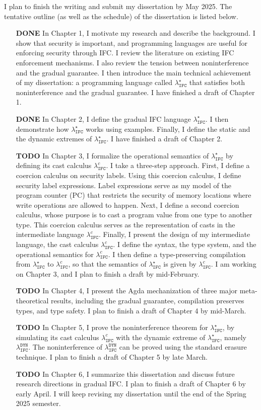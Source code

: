 \documentclass[10pt, letterpaper]{article}
\newcommand{\Surface}{\ensuremath{\lambda_{\mathtt{IFC}}^\star}\xspace}
\newcommand{\CC}{\ensuremath{\lambda_{\mathtt{IFC}}^{c}}\xspace}
\newcommand{\DynIFC}{\ensuremath{\lambda_{\mathtt{IFC}}^{\mathtt{DYN}}}\xspace}
\begin{document}
I plan to finish the writing and submit my dissertation by May 2025. The
tentative outline (as well as the schedule) of the dissertation is listed below.

\begin{enumerate}
\item[\textbf{DONE}] In Chapter 1, I motivate my research and describe the background. I show
  that security is important, and programming languages are useful for enforcing
  security through IFC. I review the literature on existing IFC enforcement
  mechanisms. I also review the tension between noninterference and the gradual
  guarantee. I then introduce the main technical achievement of my dissertation:
  a programming language called \Surface that satisfies both noninterference and
  the gradual guarantee. I have finished a draft of Chapter 1.
\item[\textbf{DONE}] In Chapter 2, I define the gradual IFC language \Surface. I
  then demonstrate how \Surface works using examples. Finally, I define the
  static and the dynamic extremes of \Surface. I have finished a draft of
  Chapter 2.
\item[\textbf{TODO}] In Chapter 3, I formalize the operational semantics of
  \Surface by defining its cast calculus \CC. I take a three-step approach.
  First, I define a coercion calculus on security labels. Using this coercion
  calculus, I define security label expressions. Label expressions serve as my
  model of the program counter (PC) that restricts the security of memory
  locations where write operations are allowed to happen. Next, I define a
  second coercion calculus, whose purpose is to cast a program value from one
  type to another type. This coercion calculus serves as the representation of
  casts in the intermediate language \CC. Finally, I present the design of my
  intermediate language, the cast calculus \CC. I define the syntax, the type
  system, and the operational semantics for \CC. I then define a type-preserving
  compilation from \Surface to \CC, so that the semantics of \Surface is given
  by \CC. I am working on Chapter 3, and I plan to finish a draft by
  mid-February.
\item[\textbf{TODO}] In Chapter 4, I present the Agda mechanization of three
  major meta-theoretical results, including the gradual guarantee, compilation
  preserves types, and type safety. I plan to finish a draft of Chapter 4 by
  mid-March.
\item[\textbf{TODO}] In Chapter 5, I prove the noninterference theorem for
  \Surface, by simulating its cast calculus \CC with the dynamic extreme of
  \Surface, namely \DynIFC. The noninterference of \DynIFC can be proved using
  the standard erasure technique. I plan to finish a draft of Chapter 5 by late
  March.
\item[\textbf{TODO}] In Chapter 6, I summarize this dissertation and discuss
  future research directions in gradual IFC. I plan to finish a draft of Chapter
  6 by early April. I will keep revising my dissertation until the end of the
  Spring 2025 semester.
\end{enumerate}

\clearpage


\end{document}
